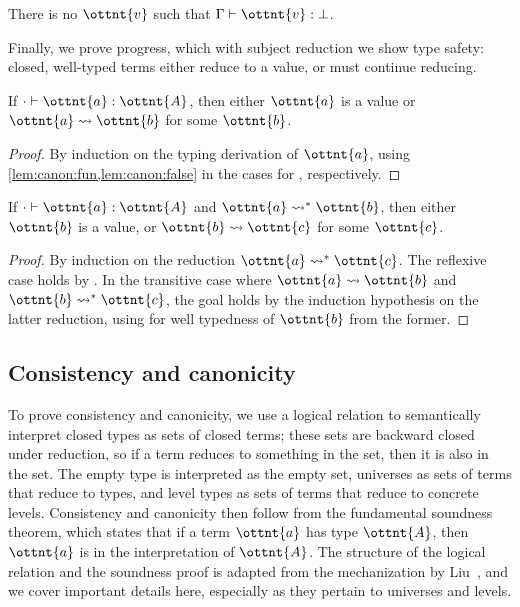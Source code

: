 \documentclass[a4paper,UKenglish,cleveref,autoref,thm-restate]{lipics-v2021}
\newcommand{\citep}[1]{\cite{#1}}
\begin{document}
\begin{lemma} \label{lem:canon:false}
  There is no $\ottnt{v}$ such that $ \Gamma  \vdash  \ottnt{v}  \mathrel{:}   \bot  $.
\end{lemma}

Finally, we prove progress, which with subject reduction we show type safety:
closed, well-typed terms either reduce to a value, or must continue reducing.

\begin{theorem}[Progress] \label{lem:progress}
  If $  \cdot   \vdash  \ottnt{a}  \mathrel{:}  \ottnt{A} $, then either $\ottnt{a}$ is a value
  or $ \ottnt{a}  \rightsquigarrow  \ottnt{b} $ for some $\ottnt{b}$.
\end{theorem}

\begin{proof}
  By induction on the typing derivation of $\ottnt{a}$,
  using \cref{lem:canon:fun,lem:canon:false}
  in the cases for , respectively.
\end{proof}

\begin{theorem}
  If $  \cdot   \vdash  \ottnt{a}  \mathrel{:}  \ottnt{A} $ and $ \ottnt{a}  \rightsquigarrow^\ast  \ottnt{b} $,
  then either $\ottnt{b}$ is a value,
  or $ \ottnt{b}  \rightsquigarrow  \ottnt{c} $ for some $\ottnt{c}$.
\end{theorem}

\begin{proof}
  By induction on the reduction $ \ottnt{a}  \rightsquigarrow^\ast  \ottnt{c} $.
  The reflexive case holds by .
  In the transitive case where $ \ottnt{a}  \rightsquigarrow  \ottnt{b} $ and $ \ottnt{b}  \rightsquigarrow^\ast  \ottnt{c} $,
  the goal holds by the induction hypothesis on the latter reduction,
  using  for well typedness of $\ottnt{b}$
  from the former.
\end{proof}

\subsection{Consistency and canonicity}

To prove consistency and canonicity,
we use a logical relation to semantically interpret closed types as sets of closed terms;
these sets are backward closed under reduction,
so if a term reduces to something in the set, then it is also in the set.
The empty type is interpreted as the empty set,
universes as sets of terms that reduce to types,
and level types as sets of terms that reduce to concrete levels.
Consistency and canonicity then follow from the fundamental soundness theorem,
which states that if a term $\ottnt{a}$ has type $\ottnt{A}$,
then $\ottnt{a}$ is in the interpretation of $\ottnt{A}$.
The structure of the logical relation and the soundness proof
is adapted from the mechanization by Liu~\citep{lr-pearl},
and we cover important details here,
especially as they pertain to universes and levels.
\end{document}
